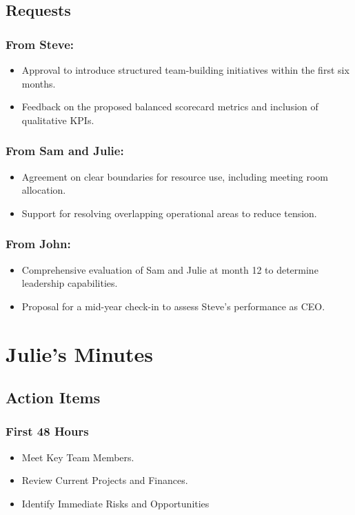 \documentclass[a4paper,12pt]{article}
\begin{document}
\subsection{Requests}
\subsubsection{From Steve:}
\begin{itemize}
    \item Approval to introduce structured team-building initiatives within the first six months.
    \item Feedback on the proposed balanced scorecard metrics and inclusion of qualitative KPIs.
\end{itemize}

\subsubsection{From Sam and Julie:}
\begin{itemize}
    \item Agreement on clear boundaries for resource use, including meeting room allocation.
    \item Support for resolving overlapping operational areas to reduce tension.
\end{itemize}

\subsubsection{From John:}
\begin{itemize}
    \item Comprehensive evaluation of Sam and Julie at month 12 to determine leadership capabilities.
    \item Proposal for a mid-year check-in to assess Steve’s performance as CEO.
\end{itemize}

\section{Julie's Minutes}
\author{Phileas Barome (John)}

\subsection{Action Items}

\subsubsection{First 48 Hours}
\begin{itemize}
    \item Meet Key Team Members.
    \item Review Current Projects and Finances.
    \item Identify Immediate Risks and Opportunities
\end{itemize}
\end{document}
